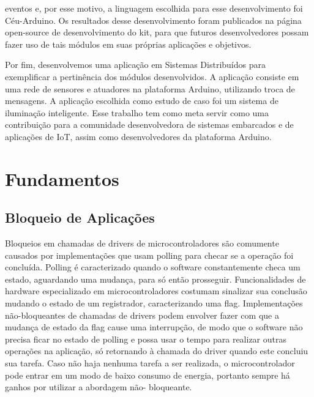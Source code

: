 \documentclass{article}
\begin{document}
eventos e, por esse motivo, a linguagem escolhida para esse desenvolvimento foi Céu-Arduino. Os
resultados desse desenvolvimento foram publicados na página open-source de desenvolvimento do
kit, para que futuros desenvolvedores possam fazer uso de tais módulos em suas próprias aplicações
e objetivos.
\par Por fim, desenvolvemos uma aplicação em Sistemas Distribuídos para exemplificar a pertinência
dos módulos desenvolvidos. A aplicação consiste em uma rede de sensores e atuadores na
plataforma Arduino, utilizando troca de mensagens. A aplicação escolhida como estudo de caso foi um sistema de iluminação inteligente. Esse trabalho tem como meta servir como uma contribuição
para a comunidade desenvolvedora de sistemas embarcados e de aplicações de IoT, assim como
desenvolvedores da plataforma Arduino. \cite{wortmann2015} \cite{chui2010} \cite{edwards1997} \cite{githubceu} \cite{atmegadatasheet}

\section{Fundamentos}

\subsection{Bloqueio de Aplicações}

\tab Bloqueios em chamadas de drivers de microcontroladores são comumente causados por implementações que usam polling para checar se a operação foi concluída. Polling é caracterizado
quando o software constantemente checa um estado, aguardando uma mudança, para só então
prosseguir. Funcionalidades de hardware especializado em microcontroladores costumam sinalizar sua
conclusão mudando o estado de um registrador, caracterizando uma flag. Implementações não-bloqueantes de chamadas de drivers podem envolver fazer com que a mudança de estado da flag cause
uma interrupção, de modo que o software não precisa ficar no estado de polling e possa usar o tempo
para realizar outras operações na aplicação, só retornando à chamada do driver quando este concluiu
sua tarefa. Caso não haja nenhuma tarefa a ser realizada, o microcontrolador pode entrar em um
modo de baixo consumo de energia, portanto sempre há ganhos por utilizar a abordagem não-
bloqueante.
\end{document}

